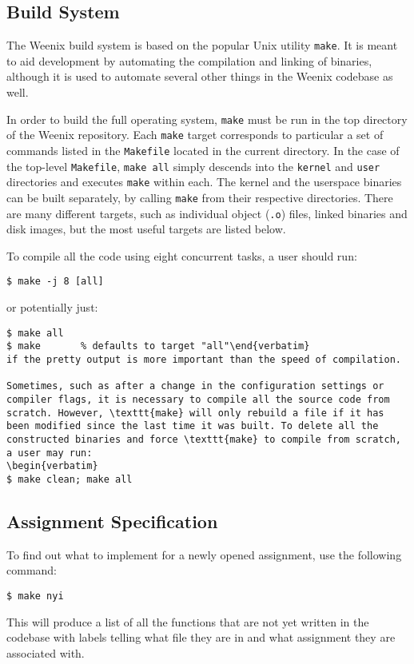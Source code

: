 \subsection{Build System}
The Weenix build system is based on the popular Unix utility \texttt{make}. It is meant to aid development by automating the compilation and linking of binaries, although it is used to automate several other things in the Weenix codebase as well.

In order to build the full operating system, \texttt{make} must be run in the top directory of the Weenix repository. Each \texttt{make} target corresponds to particular a set of commands listed in the \texttt{Makefile} located in the current directory. In the case of the top-level \texttt{Makefile}, \texttt{make all} simply descends into the \texttt{kernel} and \texttt{user} directories and executes \texttt{make} within each. The kernel and the userspace binaries can be built separately, by calling \texttt{make} from their respective directories. There are many different targets, such as individual object (\texttt{.o}) files, linked binaries and disk images, but the most useful targets are listed below.
  
To compile all the code using eight concurrent tasks, a user should run:
\begin{verbatim}
$ make -j 8 [all]\end{verbatim}
or potentially just:
\begin{verbatim}
$ make all
$ make       % defaults to target "all"\end{verbatim}
if the pretty output is more important than the speed of compilation.

Sometimes, such as after a change in the configuration settings or compiler flags, it is necessary to compile all the source code from scratch. However, \texttt{make} will only rebuild a file if it has been modified since the last time it was built. To delete all the constructed binaries and force \texttt{make} to compile from scratch, a user may run:
\begin{verbatim}
$ make clean; make all\end{verbatim}

\subsection{Assignment Specification}
To find out what to implement for a newly opened assignment, use the following command:
\begin{verbatim}
$ make nyi\end{verbatim}
This will produce a list of all the functions that are not yet written in the codebase with labels telling what file they are in and what assignment they are associated with.

